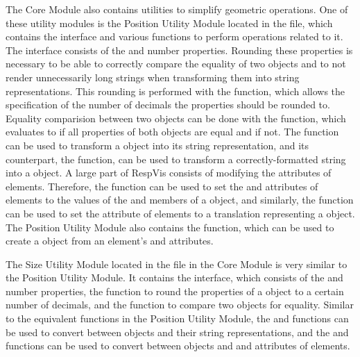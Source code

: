 The Core Module also contains utilities to simplify geometric
operations. One of these utility modules is the Position Utility
Module located in the  file, which
contains the  interface and various functions to
perform operations related to it. The  interface
consists of the  and  number properties. Rounding
these properties is necessary to be able to correctly compare the
equality of two  objects and to not render
unnecessarily long strings when transforming them into string
representations. This rounding is performed with the
 function, which allows the specification of the
number of decimals the properties should be rounded to. Equality
comparision between two  objects can be done with the
 function, which evaluates to  if all
properties of both  objects are equal and 
if not.  The  function can be used to transform
a  object into its  string
representation, and its counterpart, the 
function, can be used to transform a correctly-formatted string into a
 object.  A large part of RespVis consists of modifying
the attributes of elements.  Therefore, the 
function can be used to set the  and  attributes of
elements to the values of the  and  members of a
 object, and similarly, the
 function can be used to set the
 attribute of elements to a translation representing a
 object.  The Position Utility Module also contains the
 function, which can be used to create a
 object from an element's  and 
attributes.

The Size Utility Module located in the  file
in the Core Module is very similar to the Position Utility Module.  It
contains the  interface, which consists of the 
and  number properties, the  function to
round the properties of a  object to a certain number of
decimals, and the  function to compare two
 objects for equality.  Similar to the equivalent functions
in the Position Utility Module, the  and
 functions can be used to convert between
 objects and their string representations, and the
 and  functions can be used to
convert between  objects and  and 
attributes of elements.

